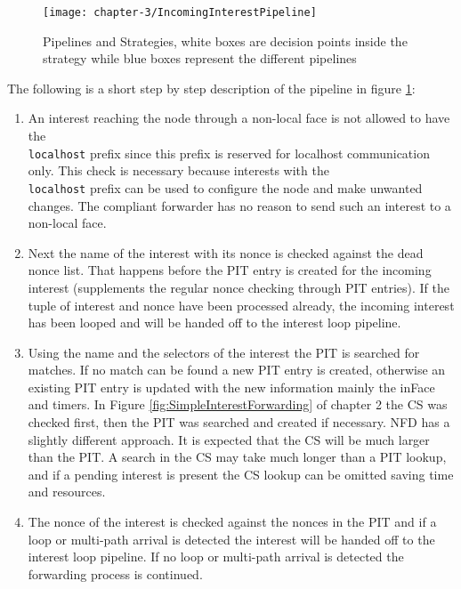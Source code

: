 \vspace{5mm} %

\begin{figure}[H]
  \centering
  \texttt{[image: chapter-3/IncomingInterestPipeline]}
  \caption{Pipelines and Strategies, white boxes are decision points inside the strategy while blue boxes represent the different pipelines \cite{Afanasyev16}}
  \label{fig:IncomingInterestPipeline}
\end{figure}

\vspace{5mm} %

The following is a short step by step description of the pipeline in figure  \ref{fig:IncomingInterestPipeline}:

\begin{enumerate}
\item An interest reaching the node through a non-local face is not allowed to have the \texttt{\\localhost} prefix since this prefix is reserved for localhost communication only. This check is necessary because interests with the \texttt{\\localhost} prefix can be used to configure the node and make unwanted changes. The compliant forwarder has no reason to send such an interest to a non-local face.
\item Next the name of the interest with its nonce is checked against the dead nonce list. That happens before the PIT entry is created for the incoming interest (supplements the regular nonce checking through PIT entries). If the tuple of interest and nonce have been processed already, the incoming interest has been looped and will be handed off to the interest loop pipeline.
\item Using the name and the selectors of the interest the PIT is searched for matches. If no match can be found a new PIT entry is created, otherwise an existing PIT entry is updated with the new information mainly the inFace and timers. In Figure \ref{fig:SimpleInterestForwarding} of chapter 2 the CS was checked first, then the PIT was searched and created if necessary. NFD has a slightly different approach. It is expected that the CS will be much larger than the PIT. A search in the CS may take much longer than a PIT lookup, and if a pending interest is present the CS lookup can be omitted saving time and resources.
\item The nonce of the interest is checked against the nonces in the PIT and if a loop or multi-path arrival is detected the interest will be handed off to the interest loop pipeline. If no loop or multi-path arrival is detected the forwarding process is continued.

\end{enumerate}
